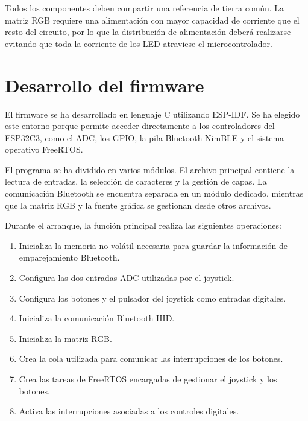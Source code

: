 Todos los componentes deben compartir una referencia de tierra común. La matriz RGB requiere una alimentación con mayor capacidad de corriente que el resto del circuito, por lo que la distribución de alimentación deberá realizarse evitando que toda la corriente de los LED atraviese el microcontrolador.


\section{Desarrollo del firmware}
\label{sec:desarrollo-firmware}

El firmware se ha desarrollado en lenguaje C utilizando ESP-IDF. Se ha elegido este entorno porque permite acceder directamente a los controladores del ESP32C3, como el ADC, los GPIO, la pila Bluetooth NimBLE y el sistema operativo FreeRTOS.

El programa se ha dividido en varios módulos. El archivo principal contiene la lectura de entradas, la selección de caracteres y la gestión de capas. La comunicación Bluetooth se encuentra separada en un módulo dedicado, mientras que la matriz RGB y la fuente gráfica se gestionan desde otros archivos.

Durante el arranque, la función principal realiza las siguientes operaciones:

\begin{enumerate}
    \item Inicializa la memoria no volátil necesaria para guardar la información de emparejamiento Bluetooth.
    \item Configura las dos entradas ADC utilizadas por el joystick.
    \item Configura los botones y el pulsador del joystick como entradas digitales.
    \item Inicializa la comunicación Bluetooth HID.
    \item Inicializa la matriz RGB.
    \item Crea la cola utilizada para comunicar las interrupciones de los botones.
    \item Crea las tareas de FreeRTOS encargadas de gestionar el joystick y los botones.
    \item Activa las interrupciones asociadas a los controles digitales.
\end{enumerate}

